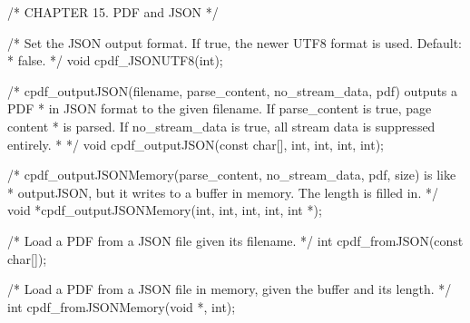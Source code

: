 /* CHAPTER 15. PDF and JSON */

/* Set the JSON output format. If true, the newer UTF8 format is used. Default:
 * false. */
void cpdf_JSONUTF8(int);

/* cpdf_outputJSON(filename, parse_content, no_stream_data, pdf) outputs a PDF
 * in JSON format to the given filename. If parse_content is true, page content
 * is parsed. If no_stream_data is true, all stream data is suppressed entirely.
 * */
void cpdf_outputJSON(const char[], int, int, int, int);

/* cpdf_outputJSONMemory(parse_content, no_stream_data, pdf, size) is like
 * outputJSON, but it writes to a buffer in memory. The length is filled in. */
void *cpdf_outputJSONMemory(int, int, int, int, int *);

/* Load a PDF from a JSON file given its filename. */
int cpdf_fromJSON(const char[]);

/* Load a PDF from a JSON file in memory, given the buffer and its length. */
int cpdf_fromJSONMemory(void *, int);

